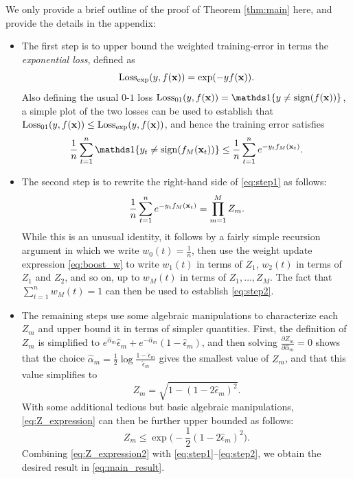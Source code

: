 \documentclass[english]{article}
\begin{document}
We only provide a brief outline of the proof of Theorem \ref{thm:main} here, and provide the details in the appendix:
\begin{itemize}
    \item The first step is to upper bound the weighted training-error in terms the  {\em exponential loss}, defined as
    \begin{equation}
        \mathrm{Loss}_{\rm exp}(y, f(\mathbf{x})) = \exp(- y f(\mathbf{x})). \label{eq:loss_exp}
    \end{equation}
    Also defining the usual $0$-$1$ loss $\Loss_{01}(y,f(\xv)) = \openone\{ y \ne \sign( f(\xv) ) \}$, a simple plot of the two losses can be used to establish that $\mathrm{Loss}_{01}(y,f(\mathbf{x})) \le \mathrm{Loss}_{\rm exp}(y, f(\mathbf{x}))$, and hence the training error satisfies
    \begin{equation}    
        \frac{1}{n}\sum_{t=1}^n\openone\{ y_t \ne \sign(f_M(\xv_t)) \} \le \frac{1}{n}\sum_{t=1}^n e^{-y_t f_M(\xv_t)}. \label{eq:step1}
    \end{equation}
    \item The second step is to rewrite the right-hand side of \eqref{eq:step1} as follows:
    \begin{equation}
        \frac{1}{n}\sum_{t=1}^n e^{-y_t f_M(\mathbf{x}_t)} = \prod_{m=1}^M Z_m. \label{eq:step2}
    \end{equation}  
    While this is an unusual identity, it follows by a fairly simple recursion argument in which we write $w_0(t) = \frac{1}{n}$, then use the weight update expression \eqref{eq:boost_w} to write $w_1(t)$ in terms of $Z_1$, $w_2(t)$ in terms of $Z_1$ and $Z_2$, and so on, up to $w_M(t)$ in terms of $Z_1,\dotsc,Z_M$.  The fact that $\sum_{t=1}^n w_M(t) = 1$ can then be used to establish \eqref{eq:step2}.
    \item The remaining steps use some algebraic manipulations to characterize each $Z_m$ and upper bound it in terms of simpler quantities.  First, the definition of $Z_m$ is simplified to $e^{\hat{\alpha}_m} \hat{\epsilon}_m + e^{-\hat{\alpha}_m}(1 - \hat{\epsilon}_m)$, and then solving $\frac{\partial Z_m}{\partial \hat{\alpha}_m} = 0$ shows that the choice $\hat{\alpha}_m = \frac{1}{2} \log \frac{1 - \hat{\epsilon}_m}{\hat{\epsilon}_m}$ gives the smallest value of $Z_m$, and that this value simplifies to
    \begin{equation}
        Z_m = \sqrt{ 1 - (1-2\hat{\epsilon}_m)^2 }. \label{eq:Z_expression}
    \end{equation}
    With some additional tedious but basic algebraic manipulations, \eqref{eq:Z_expression} can then be further upper bounded as follows:
    \begin{equation}
        Z_m \le \exp\Big( -\frac{1}{2} (1-2\hat{\epsilon}_m)^2 \Big). \label{eq:Z_expression2}
    \end{equation}
    Combining \eqref{eq:Z_expression2} with \eqref{eq:step1}--\eqref{eq:step2}, we obtain the desired result in \eqref{eq:main_result}.
\end{itemize}
\end{document}
